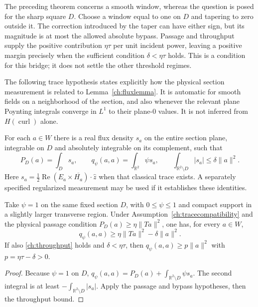 The preceding theorem concerns a smooth window, whereas the question is
posed for the sharp square $D$.  Choose a window equal to one on $D$ and
tapering to zero outside it.  The correction introduced by the taper can
have either sign, but its magnitude is at most the allowed absolute bypass.
Passage and throughput supply the positive contribution $\eta\tau$ per unit
incident power, leaving a positive margin precisely when the sufficient
condition $\delta<\eta\tau$ holds.  This is a condition for this bridge;
it does not settle the other threshold regimes.

The following trace hypothesis states explicitly how the physical section
measurement is related to Lemma~\ref{ch:fluxlemma}.  It is automatic for
smooth fields on a neighborhood of the section, and also whenever the
relevant plane Poynting integrals converge in $L^1$ to their plane-$0$
values.  It is not inferred from $H(\operatorname{curl})$ alone.

\begin{assumption}
\label{ch:tracecompatibility}
For each $a\in W$ there is a real flux density $s_a$ on the entire section
plane, integrable on $D$ and absolutely integrable on its complement,
such that
\begin{equation}
 P_D(a)=\int_Ds_a,\qquad
 q_\psi(a,a)=\int_{\mathbb R^2}\psi s_a,\qquad
 \int_{\mathbb R^2\setminus D}|s_a|\leq\delta\|a\|^2.
 \label{ch:traceagreement}
\end{equation}
Here $s_a=\tfrac12\operatorname{Re}(E_a\times\overline{H_a})\cdot\hat z$
when that classical trace exists.  A separately specified regularized
measurement may be used if it establishes these identities.
\end{assumption}

\begin{lemma}
\label{ch:outerwindow}
Take $\psi=1$ on the same fixed section $D$, with $0\leq\psi\leq1$
and compact support in a slightly larger transverse region.  Under
Assumption~\ref{ch:tracecompatibility} and the physical passage condition
$P_D(a)\geq\eta\|Ta\|^2$, one has, for every $a\in W$,
\begin{equation}
 q_\psi(a,a)\geq\eta\|Ta\|^2-\delta\|a\|^2.
 \label{ch:outerwindowbound}
\end{equation}
If also \eqref{ch:throughput} holds and $\delta<\eta\tau$, then
$q_\psi(a,a)\geq p\|a\|^2$ with $p=\eta\tau-\delta>0$.
\end{lemma}
\begin{proof}
Because $\psi=1$ on $D$,
$q_\psi(a,a)=P_D(a)+\int_{\mathbb R^2\setminus D}\psi s_a$.
The second integral is at least
$-\int_{\mathbb R^2\setminus D}|s_a|$.
Apply the passage and bypass hypotheses, then the throughput bound.
\end{proof}

